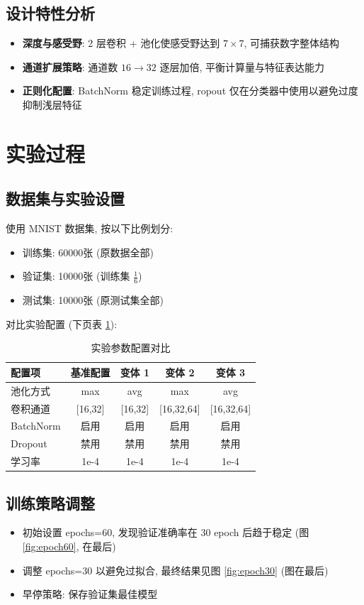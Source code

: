 \documentclass{article}
\begin{document}
		\subsection{设计特性分析}
			\begin{itemize}
				\item \textbf{深度与感受野}: 2 层卷积 + 池化使感受野达到 $7 \times 7$, 可捕获数字整体结构
				\item \textbf{通道扩展策略}: 通道数 $16 \to 32$ 逐层加倍, 平衡计算量与特征表达能力
				\item \textbf{正则化配置}: BatchNorm 稳定训练过程, ropout 仅在分类器中使用以避免过度抑制浅层特征
			\end{itemize}

	\section{实验过程}
		\subsection{数据集与实验设置}
			使用 MNIST 数据集, 按以下比例划分:
			\begin{itemize}
				\item 训练集: 60000张 (原数据全部)
				\item 验证集: 10000张 (训练集 $\frac{1}{6}$)
				\item 测试集: 10000张 (原测试集全部)
			\end{itemize}

			\noindent 对比实验配置 (下页表 \ref{tab:config}):
			\begin{table}[htbp]
				\centering
				\caption{实验参数配置对比}
				\begin{tabular}{lcccc}
					\toprule
					配置项 & 基准配置 & 变体 1 & 变体 2 & 变体 3 \\
					\midrule
					池化方式 & max & avg & max & avg \\
					卷积通道 & [16,32] & [16,32] & [16,32,64] & [16,32,64] \\
					BatchNorm & 启用 & 启用 & 启用 & 启用 \\
					Dropout & 禁用 & 禁用 & 禁用 & 禁用 \\
					学习率 & 1e-4 & 1e-4 & 1e-4 & 1e-4 \\
					\bottomrule
				\end{tabular}
				\label{tab:config}
			\end{table}

		\subsection{训练策略调整}
			\begin{itemize}
				\item 初始设置 epochs=60, 发现验证准确率在 30 epoch 后趋于稳定 (图 \ref{fig:epoch60}, 在最后)
				\item 调整 epochs=30 以避免过拟合, 最终结果见图 \ref{fig:epoch30} (图在最后)
				\item 早停策略: 保存验证集最佳模型
			\end{itemize}
\end{document}
